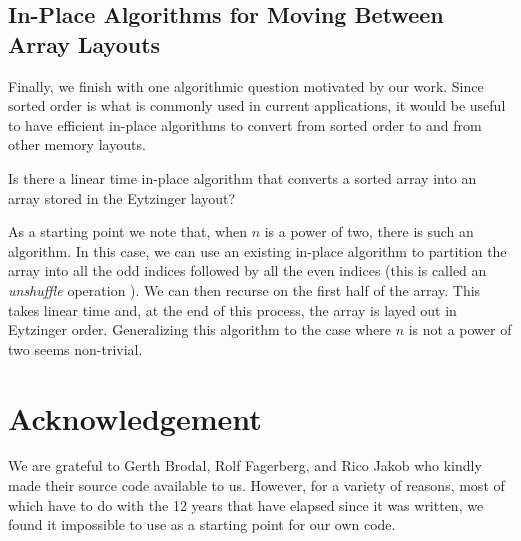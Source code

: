 \documentclass{patmorin}
\begin{document}
\subsection{In-Place Algorithms for Moving Between Array Layouts}

Finally, we finish with one algorithmic question motivated by our work.
Since sorted order is what is commonly used in current applications,
it would be useful to have efficient in-place algorithms to convert from
sorted order to and from other memory layouts.

\begin{op}
  Is there a linear time in-place algorithm that converts a sorted array
  into an array stored in the Eytzinger layout?
\end{op}

As a starting point we note that, when $n$ is a power of two, there
is such an algorithm.  In this case, we can use an existing in-place
algorithm to partition the array into all the odd indices followed
by all the even indices (this is called an \emph{unshuffle} operation
\cite[Section~7]{ellis.markov:in-situ}). We can then recurse on the first
half of the array. This takes linear time and, at the end of this process,
the array is layed out in Eytzinger order.  Generalizing this algorithm
to the case where $n$ is not a power of two seems non-trivial.

\section*{Acknowledgement}

We are grateful to  Gerth Brodal, Rolf Fagerberg, and Rico Jakob who
kindly made their source code available to us. However, for a variety
of reasons, most of which have to do with the 12 years that have elapsed
since it was written, we found it impossible to use as a starting point
for our own code.




\end{document}
